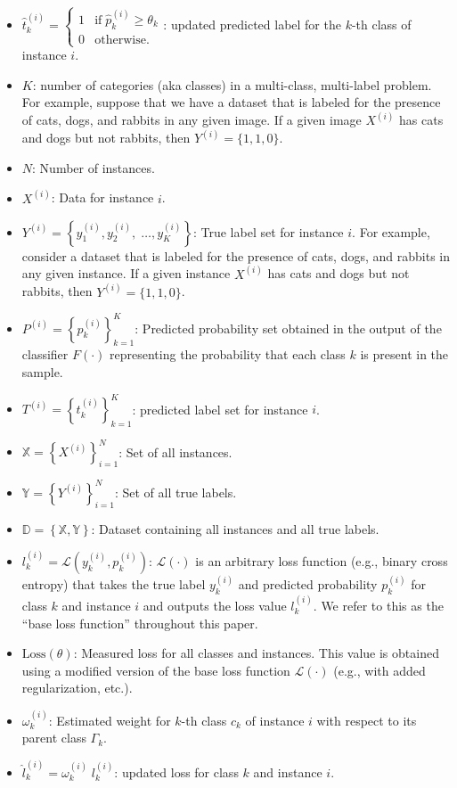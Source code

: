 \documentclass[final,1p,times,authoryear]{elsarticle}
\begin{document}
\begin{itemize}
    \item  $\widehat{t}_k^{(i)}=\left\{\begin{array}{ll}1&\text{if}\;\widehat{p}_k^{(i)}\geq\theta_k\\0&\text{otherwise.}\end{array}\right. $: updated predicted label for the $k $-th class of instance $i $.
    \item $K $: number of categories (aka classes) in a multi-class, multi-label problem. For example, suppose that we have a dataset that is labeled for the presence of cats, dogs, and rabbits in any given image. If a given image $X^{(i)} $ has cats and dogs but not rabbits, then $Y^{(i)} = \{1,1,0\} $.
    \item $N $: Number of instances.
    \item $X^{(i)} $: Data for instance $i$.
    \item $Y^{(i)}=\left\{y_1^{(i)},y_2^{(i)},\;\dots,y_{K}^{(i)}\right\} $: True label set for instance $i $. For example, consider a dataset that is labeled for the presence of cats, dogs, and rabbits in any given instance. If a given instance $X^{(i)} $ has cats and dogs but not rabbits, then $Y^{(i)}=\{1,1,0\} $.
    \item $P^{(i)} = {\left\{ p_k^{(i)} \right\}}_{k=1}^{K} $: Predicted probability set obtained in the output of the classifier $F(\cdot) $ representing the probability that each class $k $ is present in the sample.
    \item $T^{(i)} = {\left\{t_k^{(i)}\right\}}_{k=1}^{K} $: predicted label set for instance $i $.
    \item $\mathbb{X} = {\left\{X^{(i)}\right\}}_{i=1}^{N} $: Set of all instances.
    \item $\mathbb{Y} = {\left\{Y^{(i)}\right\}}_{i=1}^{N} $: Set of all true labels.
    \item $\mathbb{D}=\left\{\mathbb{X},\mathbb{Y}\right\} $: Dataset containing all instances and all true labels.
    \item $l_k^{(i)} = \mathcal{L} \left(y_k^{(i)},p_k^{(i)}\right) $:  $\mathcal{L}( \cdot) $ is an arbitrary loss function (e.g., binary cross entropy) that takes the true label $y_k^{(i)}$ and predicted probability $p_k^{(i)}$ for class $k$ and instance $i$ and outputs the loss value $l_k^{(i)} $. We refer to this as the ``base loss function'' throughout this paper.
    \item $\text{Loss}(\theta) $: Measured loss for all classes and instances. This value is obtained using a modified version of the base loss function $\mathcal{L}(\cdot) $ (e.g., with added regularization, etc.).
    \item $\omega_k^{(i)} $: Estimated weight for $k$-th class $c_k $ of instance $i $ with respect to its parent class $\Gamma_k $.
    \item ${\widehat l}_k^{(i)} = \omega_k^{(i)} \; l_k^{(i)} $: updated loss for class $k $ and instance $i $.
\end{itemize}
\end{document}
